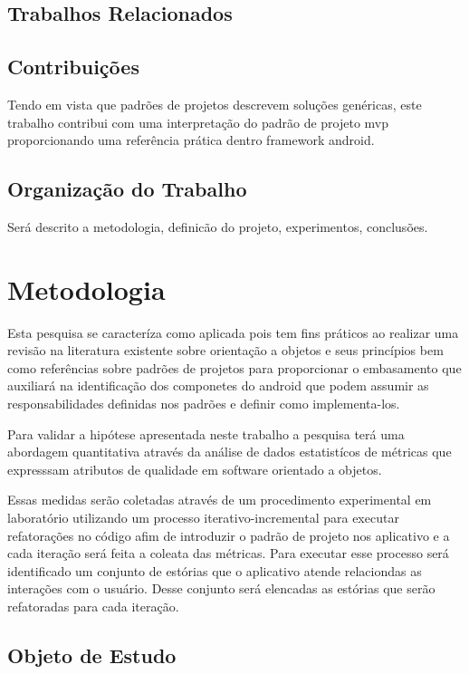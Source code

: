 \section{Trabalhos Relacionados}

\section{Contribuições}

Tendo em vista que padrões de projetos descrevem soluções genéricas, este
trabalho contribui com uma interpretação do padrão de projeto mvp proporcionando
uma referência prática dentro framework android.

\section{Organização do Trabalho}

Será descrito a metodologia, definicão do projeto, experimentos, conclusões.


\chapter{Metodologia}

Esta pesquisa se caracteríza como aplicada pois tem fins práticos ao realizar
uma revisão na literatura existente sobre orientação a objetos e seus princípios
bem como referências sobre padrões de projetos para proporcionar o embasamento
que auxiliará na identificação dos componetes do android que podem assumir as
responsabilidades definidas nos padrões e definir como implementa-los.

Para validar a hipótese apresentada neste trabalho a pesquisa terá uma
abordagem quantitativa através da análise de dados estatistícos de métricas 
que expresssam atributos de qualidade em software orientado a objetos.

Essas medidas serão coletadas através de um procedimento experimental em
laboratório utilizando um processo iterativo-incremental para executar
refatorações no código afim de introduzir o padrão de projeto nos aplicativo e a
cada iteração será feita a coleata das métricas.
Para executar esse processo será identificado um conjunto de estórias que o
aplicativo atende relaciondas as interações com o usuário. Desse conjunto será
elencadas as estórias que serão refatoradas para cada iteração.



\section{Objeto de Estudo}

